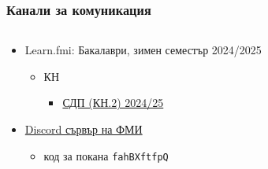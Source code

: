 \documentclass[alsotrans,beameroptions={aspectratio=169}]{beamerswitch}
\begin{document}
\begin{frame}
  \frametitle{Канали за комуникация}
  \begin{columns}[T,onlytextwidth]
    \begin{column}{.7\textwidth}
      \begin{itemize}
      \item Learn.fmi: Бакалаври, зимен семестър 2024/2025
        \begin{itemize}
        \item КН
          \begin{itemize}
          \item \href{https://learn.fmi.uni-sofia.bg/course/view.php?id=10454}{СДП (КН.2) 2024/25}
        \end{itemize}
      \end{itemize}
      \vspace{7ex}
    \item \href{https://discord.gg/fahBXftfpQ}{Discord сървър на ФМИ}
    \begin{itemize}
    \item код за покана \tt{fahBXftfpQ}
    \end{itemize}
  \end{itemize}              
\end{column}
\begin{column}{.3\textwidth}
  
  \vspace{4ex}
\end{column}
\end{columns}
\end{frame}
\end{document}
